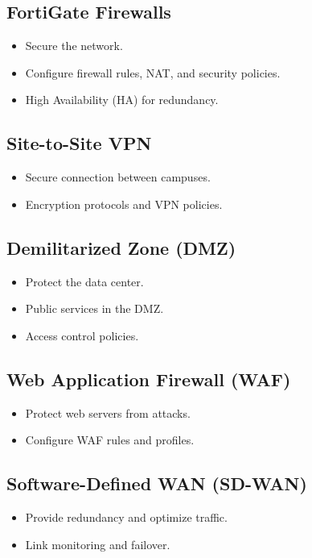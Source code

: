\documentclass[12pt]{report}
\begin{document}
\subsection{FortiGate Firewalls}
\begin{itemize}
    \item Secure the network.
    \item Configure firewall rules, NAT, and security policies.
    \item High Availability (HA) for redundancy.
\end{itemize}

\subsection{Site-to-Site VPN}
\begin{itemize}
    \item Secure connection between campuses.
    \item Encryption protocols and VPN policies.
\end{itemize}

\subsection{Demilitarized Zone (DMZ)}
\begin{itemize}
    \item Protect the data center.
    \item Public services in the DMZ.
    \item Access control policies.
\end{itemize}

\subsection{Web Application Firewall (WAF)}
\begin{itemize}
    \item Protect web servers from attacks.
    \item Configure WAF rules and profiles.
\end{itemize}

\subsection{Software-Defined WAN (SD-WAN)}
\begin{itemize}
    \item Provide redundancy and optimize traffic.
    \item Link monitoring and failover.
\end{itemize}
\end{document}
